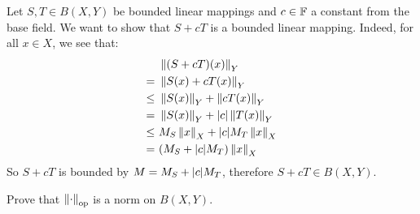 \begin{soln}
    Let $ S, T \in B(X, Y) $ be bounded linear mappings and $ c \in \mathbb{F} $ a
    constant from the base field.
    We want to show that $ S + cT $ is a bounded linear mapping. \vsp
    Indeed, for all $ x \in X $, we see that:
    \begin{align*}
         & \left\|(S + cT)(x)\right\|_{Y} \\
        = \ & \left\|S(x) + cT(x)\right\|_{Y} \\
        \leq \ & \left\|S(x)\right\|_{Y} + \left\|cT(x)\right\|_{Y} \\
        = \ & \left\|S(x)\right\|_{Y} + \abs{c} \left\|T(x)\right\|_{Y} \\
        \leq \ & M_{S}\left\|x\right\|_{X} + \abs{c}M_{T}\left\|x\right\|_{X} \\
        = \ & (M_{S} + \abs{c}M_{T})\left\|x\right\|_{X}
    \end{align*}
    So $ S + cT $ is bounded by $ M = M_{S} + \abs{c}M_{T} $, therefore $ S + cT 
    \in B(X, Y) $.
\end{soln}

\begin{qu}[num=6.2]
    Prove that $ \left\|\cdot\right\|_{\textrm{op}} $ is a norm on $ B(X, Y) $.
\end{qu}

